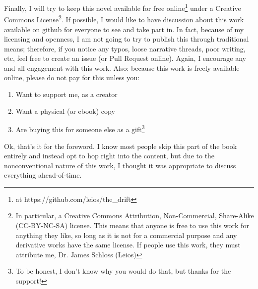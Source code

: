 Finally, I will try to keep this novel available for free online\footnote{at https://github.com/leios/the\_drift} under a Creative Commons License\footnote{In particular, a Creative Commons Attribution, Non-Commercial, Share-Alike (CC-BY-NC-SA) license. This means that anyone is free to use this work for anything they like, so long as it is not for a commercial purpose and any derivative works have the same license. If people use this work, they must attribute me, Dr. James Schloss (Leios)}.
If possible, I would like to have discussion about this work available on github for everyone to see and take part in.
In fact, because of my licensing and openness, I am not going to try to publish this through traditional means; therefore, if you notice any typos, loose narrative threads, poor writing, etc, feel free to create an issue (or Pull Request online).
Again, I encourage any and all engagement with this work.
Also: because this work is freely available online, please do not pay for this unless you:
\begin{enumerate}
\item Want to support me, as a creator
\item Want a physical (or ebook) copy
\item Are buying this for someone else as a gift\footnote{To be honest, I don't know why you would do that, but thanks for the support!}
\end{enumerate}

Ok, that's it for the foreword.
I know most people skip this part of the book entirely and instead opt to hop right into the content, but due to the nonconventional nature of this work, I thought it was appropriate to discuss everything ahead-of-time.

